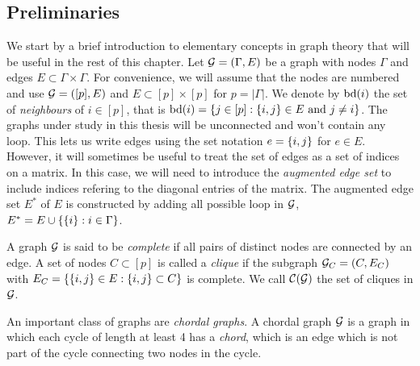 \subsection{Preliminaries}

We start by a brief introduction to elementary concepts in graph theory that will be useful in the rest of this chapter. Let ${\mathcal{G}} = (\Gamma, E)$ be a graph with nodes $\Gamma$ and edges $E \subset \Gamma \times \Gamma$. For convenience, we will assume that the nodes are numbered and use  ${\mathcal{G}} = ([p], E)$ and $E \subset [p] \times [p]$ for $p = |\Gamma|$.  We denote by ${\textrm{bd}}(i)$ the set of \textit{neighbours} of $i \in [p]$, that is ${\textrm{bd}}(i) = {\left\{ j \in [p] : {\left\{i, j\right\}} \in E {\textrm{ and }} j \neq i\right\}}$. The graphs under study in this thesis will be unconnected and won't contain any loop. This lets us write edges using the set notation $e = {\left\{i, j\right\}}$ for $e \in E$. However, it will sometimes be useful to treat the set of edges as a set of indices on a matrix. In this case, we will need to introduce the \textit{augmented edge set} to include indices refering to the diagonal entries of the matrix. The augmented edge set $E^*$ of $E$ is constructed by adding all possible loop in ${\mathcal{G}}$, $E^* = E \cup {\left\{ {\left\{i\right\}} : i \in \Gamma \right\}}$.

A graph ${\mathcal{G}}$ is said to be \textit{complete} if all pairs of distinct nodes are connected by an edge. A set of nodes $C \subset [p]$ is called a \textit{clique} if the subgraph ${\mathcal{G}}_C = (C, E_C)$ with $E_C = {\left\{ {\left\{i, j\right\}} \in E : {\left\{i, j\right\}} \subset C \right\}}$ is complete. We call ${\mathcal{C}}({\mathcal{G}})$ the set of cliques in ${\mathcal{G}}$.

An important class of graphs are \textit{chordal graphs}. A chordal graph ${\mathcal{G}}$ is a graph in which each cycle of length at least 4 has a \textit{chord}, which is an edge which is not part of the cycle connecting two nodes in the cycle.


